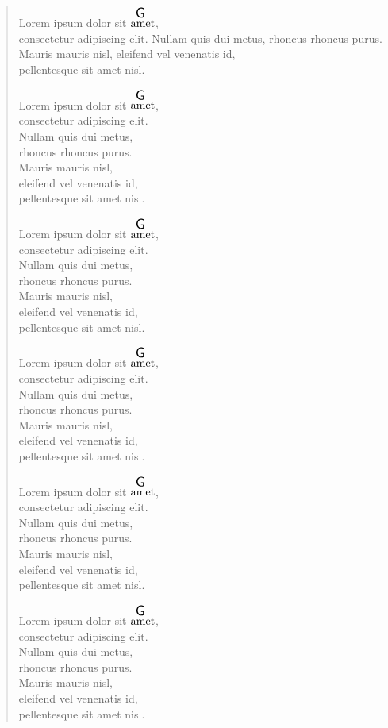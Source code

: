 \documentclass[twocolumn]{article}
\begin{document}
\begin{verse}

Lorem ipsum dolor sit $\overset{ \resizebox{0.3cm}{!}{\textsf{G}} }{\text{amet}}$, \\
consectetur adipiscing elit.
Nullam quis dui metus, 
rhoncus rhoncus purus. 
Mauris mauris nisl, 
eleifend vel venenatis id, \\
pellentesque sit amet nisl.


Lorem ipsum dolor sit $\overset{ \resizebox{0.3cm}{!}{\textsf{G}} }{\text{amet}}$, \\
consectetur adipiscing elit.\\
Nullam quis dui metus, \\
rhoncus rhoncus purus. \\
Mauris mauris nisl, \\
eleifend vel venenatis id, \\
pellentesque sit amet nisl.

Lorem ipsum dolor sit $\overset{ \resizebox{0.3cm}{!}{\textsf{G}} }{\text{amet}}$, \\
consectetur adipiscing elit.\\
Nullam quis dui metus, \\
rhoncus rhoncus purus. \\
Mauris mauris nisl, \\
eleifend vel venenatis id, \\
pellentesque sit amet nisl.

Lorem ipsum dolor sit $\overset{ \resizebox{0.3cm}{!}{\textsf{G}} }{\text{amet}}$, \\
consectetur adipiscing elit.\\
Nullam quis dui metus, \\
rhoncus rhoncus purus. \\
Mauris mauris nisl, \\
eleifend vel venenatis id, \\
pellentesque sit amet nisl.

Lorem ipsum dolor sit $\overset{ \resizebox{0.3cm}{!}{\textsf{G}} }{\text{amet}}$, \\
consectetur adipiscing elit.\\
Nullam quis dui metus, \\
rhoncus rhoncus purus. \\
Mauris mauris nisl, \\
eleifend vel venenatis id, \\
pellentesque sit amet nisl.

Lorem ipsum dolor sit $\overset{ \resizebox{0.3cm}{!}{\textsf{G}} }{\text{amet}}$, \\
consectetur adipiscing elit.\\
Nullam quis dui metus, \\
rhoncus rhoncus purus. \\
Mauris mauris nisl, \\
eleifend vel venenatis id, \\
pellentesque sit amet nisl.


\end{verse}
\end{document}

